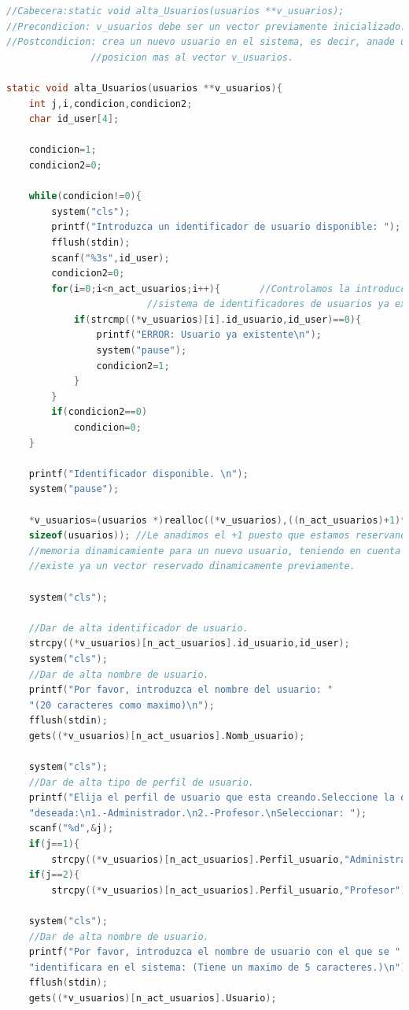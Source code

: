 \documentclass{book}
\begin{document}
\begin{lstlisting}[language=C]
//Cabecera:static void alta_Usuarios(usuarios **v_usuarios);
//Precondicion: v_usuarios debe ser un vector previamente inicializado.
//Postcondicion: crea un nuevo usuario en el sistema, es decir, anade una
               //posicion mas al vector v_usuarios.

static void alta_Usuarios(usuarios **v_usuarios){
    int j,i,condicion,condicion2;
    char id_user[4];

    condicion=1;
    condicion2=0;

    while(condicion!=0){
        system("cls");
        printf("Introduzca un identificador de usuario disponible: ");
        fflush(stdin);
        scanf("%3s",id_user);
        condicion2=0;
        for(i=0;i<n_act_usuarios;i++){       //Controlamos la introduccion en el
                         //sistema de identificadores de usuarios ya existentes.
            if(strcmp((*v_usuarios)[i].id_usuario,id_user)==0){
                printf("ERROR: Usuario ya existente\n");
                system("pause");
                condicion2=1;
            }
        }
        if(condicion2==0)
            condicion=0;
    }

    printf("Identificador disponible. \n");
    system("pause");

    *v_usuarios=(usuarios *)realloc((*v_usuarios),((n_act_usuarios)+1)*
    sizeof(usuarios)); //Le anadimos el +1 puesto que estamos reservando
    //memoria dinamicamiente para un nuevo usuario, teniendo en cuenta que
    //existe ya un vector reservado dinamicamente previamente.

    system("cls");

    //Dar de alta identificador de usuario.
    strcpy((*v_usuarios)[n_act_usuarios].id_usuario,id_user);
    system("cls");
    //Dar de alta nombre de usuario.
    printf("Por favor, introduzca el nombre del usuario: "
    "(20 caracteres como maximo)\n");
    fflush(stdin);
    gets((*v_usuarios)[n_act_usuarios].Nomb_usuario);

    system("cls");
    //Dar de alta tipo de perfil de usuario.
    printf("Elija el perfil de usuario que esta creando.Seleccione la opcion"
    "deseada:\n1.-Administrador.\n2.-Profesor.\nSeleccionar: ");
    scanf("%d",&j);
    if(j==1){
        strcpy((*v_usuarios)[n_act_usuarios].Perfil_usuario,"Administrador");}
    if(j==2){
        strcpy((*v_usuarios)[n_act_usuarios].Perfil_usuario,"Profesor");}

    system("cls");
    //Dar de alta nombre de usuario.
    printf("Por favor, introduzca el nombre de usuario con el que se "
    "identificara en el sistema: (Tiene un maximo de 5 caracteres.)\n");
    fflush(stdin);
    gets((*v_usuarios)[n_act_usuarios].Usuario);


\end{lstlisting}
\end{document}
